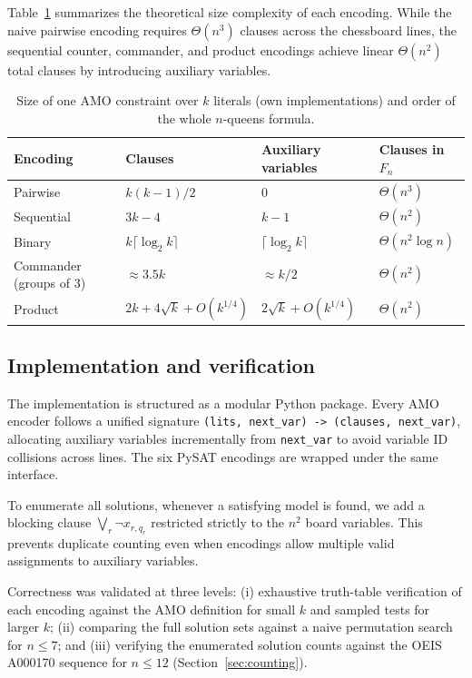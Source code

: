 \documentclass[a4paper,fleqn]{cas-sc}
\begin{document}
Table~\ref{tab:sizes} summarizes the theoretical size complexity of each encoding. While the naive pairwise encoding requires $\Theta(n^3)$ clauses across the chessboard lines, the sequential counter, commander, and product encodings achieve linear $\Theta(n^2)$ total clauses by introducing auxiliary variables.

\begin{table}[pos=!htb]
\caption{Size of one AMO constraint over $k$ literals (own implementations) and order of the whole $n$-queens formula.}\label{tab:sizes}
\centering
\begin{tabular}{@{}llll@{}}
\toprule
Encoding & Clauses & Auxiliary variables & Clauses in $F_n$ \\
\midrule
Pairwise   & $k(k-1)/2$ & $0$ & $\Theta(n^3)$ \\
Sequential & $3k-4$ & $k-1$ & $\Theta(n^2)$ \\
Binary     & $k\lceil\log_2 k\rceil$ & $\lceil\log_2 k\rceil$ & $\Theta(n^2\log n)$ \\
Commander (groups of 3) & $\approx 3.5k$ & $\approx k/2$ & $\Theta(n^2)$ \\
Product    & $2k+4\sqrt{k}+O(k^{1/4})$ & $2\sqrt{k}+O(k^{1/4})$ & $\Theta(n^2)$ \\
\bottomrule
\end{tabular}
\end{table}

\subsection{Implementation and verification}\label{sec:implementation}

The implementation is structured as a modular Python package. Every AMO encoder follows a unified signature \texttt{(lits, next\_var) -> (clauses, next\_var)}, allocating auxiliary variables incrementally from \texttt{next\_var} to avoid variable ID collisions across lines. The six PySAT encodings are wrapped under the same interface.

To enumerate all solutions, whenever a satisfying model is found, we add a blocking clause $\bigvee_r \neg x_{r,q_r}$ restricted strictly to the $n^2$ board variables. This prevents duplicate counting even when encodings allow multiple valid assignments to auxiliary variables.

Correctness was validated at three levels: (i) exhaustive truth-table verification of each encoding against the AMO definition for small $k$ and sampled tests for larger $k$; (ii) comparing the full solution sets against a naive permutation search for $n\le 7$; and (iii) verifying the enumerated solution counts against the OEIS A000170 sequence for $n\le 12$ (Section~\ref{sec:counting}).
\end{document}

